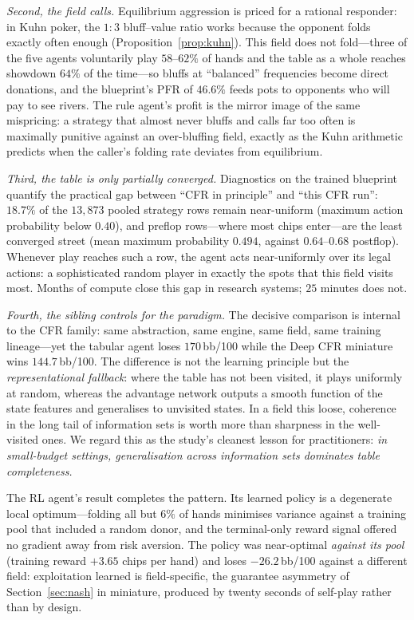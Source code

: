 \emph{Second, the field calls.} Equilibrium aggression is priced for a rational responder: in Kuhn poker, the $1{:}3$ bluff--value ratio works because the opponent folds exactly often enough (Proposition~\ref{prop:kuhn}). This field does not fold---three of the five agents voluntarily play $58$--$62\%$ of hands and the table as a whole reaches showdown $64\%$ of the time---so bluffs at ``balanced'' frequencies become direct donations, and the blueprint's PFR of $46.6\%$ feeds pots to opponents who will pay to see rivers. The rule agent's profit is the mirror image of the same mispricing: a strategy that almost never bluffs and calls far too often is maximally punitive against an over-bluffing field, exactly as the Kuhn arithmetic predicts when the caller's folding rate deviates from equilibrium.

\emph{Third, the table is only partially converged.} Diagnostics on the trained blueprint quantify the practical gap between ``CFR in principle'' and ``this CFR run'': $18.7\%$ of the $13{,}873$ pooled strategy rows remain near-uniform (maximum action probability below $0.40$), and preflop rows---where most chips enter---are the least converged street (mean maximum probability $0.494$, against $0.64$--$0.68$ postflop). Whenever play reaches such a row, the agent acts near-uniformly over its legal actions: a sophisticated random player in exactly the spots that this field visits most. Months of compute close this gap in research systems; $25$ minutes does not.

\emph{Fourth, the sibling controls for the paradigm.} The decisive comparison is internal to the CFR family: same abstraction, same engine, same field, same training lineage---yet the tabular agent loses $170$\,bb/100 while the Deep CFR miniature wins $144.7$\,bb/100. The difference is not the learning principle but the \emph{representational fallback}: where the table has not been visited, it plays uniformly at random, whereas the advantage network outputs a smooth function of the state features and generalises to unvisited states. In a field this loose, coherence in the long tail of information sets is worth more than sharpness in the well-visited ones. We regard this as the study's cleanest lesson for practitioners: \emph{in small-budget settings, generalisation across information sets dominates table completeness.}

The RL agent's result completes the pattern. Its learned policy is a degenerate local optimum---folding all but $6\%$ of hands minimises variance against a training pool that included a random donor, and the terminal-only reward signal offered no gradient away from risk aversion. The policy was near-optimal \emph{against its pool} (training reward $+3.65$ chips per hand) and loses $-26.2$\,bb/100 against a different field: exploitation learned is field-specific, the guarantee asymmetry of Section~\ref{sec:nash} in miniature, produced by twenty seconds of self-play rather than by design.

